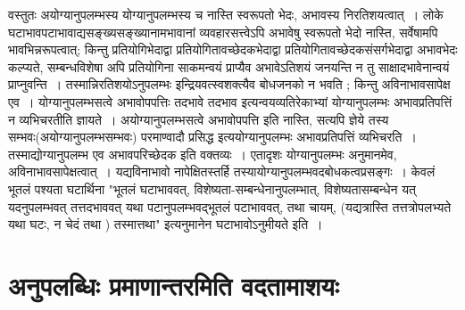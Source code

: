 {वस्तुतः अयोग्यानुपलम्भस्य योग्यानुपलम्भस्य च नास्ति स्वरूपतो भेदः, अभावस्य निरतिशयत्वात्~। लोके घटाभावपटाभावाद्यसङ्ख्यसङ्ख्यानामभावानां व्यवहारसत्त्वेऽपि अभावेषु स्वरूपतो भेदो नास्ति, सर्वेषामपि भावभिन्नरूपत्वात्; किन्तु प्रतियोगिभेदाद्वा प्रतियोगितावच्छेदकभेदाद्वा प्रतियोगितावच्छेदकसंसर्गभेदाद्वा अभावभेदः कल्प्यते, सम्बन्धविशेषा अपि प्रतियोगिना साकमन्वयं प्राप्यैव अभावेऽतिशयं जनयन्ति न तु साक्षादभावेनान्वयं प्राप्नुवन्ति~। तस्मान्निरतिशयोऽनुपलम्भः इन्द्रियवत्स्वशक्त्यैव बोधजनको न भवति ; किन्तु अविनाभावसापेक्ष एव~। योग्यानुपलम्भसत्वे अभावोपपत्तिः तदभावे तदभाव इत्यन्वयव्यतिरेकाभ्यां योग्यानुपलम्भः अभावप्रतिपत्तिं न व्यभिचरतीति ज्ञायते~। अयोग्यानुपलम्भसत्वे अभावोपपत्ति इति नास्ति, सत्यपि ज्ञेये तस्य सम्भवः(अयोग्यानुपलम्भसम्भवः) परमाण्वादौ प्रसिद्ध इत्ययोग्यानुपलम्भः अभावप्रतिपत्तिं व्यभिचरति~। तस्माद्योग्यानुपलम्भ एव अभावपरिच्छेदक इति वक्तव्यः~। एतादृशः योग्यानुपलम्भः अनुमानमेव, अविनाभावसापेक्षत्वात्~। यद्यविनाभावो नापेक्षितस्तर्हि तस्यायोग्यानुपलम्भवदबोधकत्वप्रसङ्गः~। केवलं भूतलं पश्यता घटार्थिना "भूतलं घटाभाववत्, विशेष्यता-सम्बन्धेनानुपलम्भात्, विशेष्यतासम्बन्धेन यत् यदनुपलम्भवत् तत्तदभाववत् यथा पटानुपलम्भवद्भूतलं पटाभाववत्, तथा चायम्, (यद्यत्रास्ति तत्तत्रोपलभ्यते यथा घटः, न चेदं तथा ) तस्मात्तथा" इत्यनुमानेन घटाभावोऽनुमीयते इति~। 

\section*{अनुपलब्धिः प्रमाणान्तरमिति वदतामाशयः} 

}
